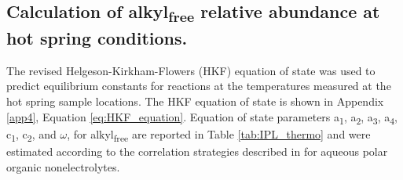 \subsection{Calculation of alkyl\textsubscript{free} relative abundance at hot spring conditions.}

The revised Helgeson-Kirkham-Flowers (HKF) equation of state \citep{shock1992calculation} was used to predict equilibrium constants for reactions at the temperatures measured at the hot spring sample locations. The HKF equation of state is shown in Appendix \ref{app4}, Equation \ref{eq:HKF_equation}. Equation of state parameters a\textsubscript{1}, a\textsubscript{2}, a\textsubscript{3}, a\textsubscript{4}, c\textsubscript{1}, c\textsubscript{2}, and $\omega$, for alkyl\textsubscript{free} are reported in Table \ref{tab:IPL_thermo} and were estimated according to the correlation strategies described in \cite{plyasunov2001correlation} for aqueous polar organic nonelectrolytes.

